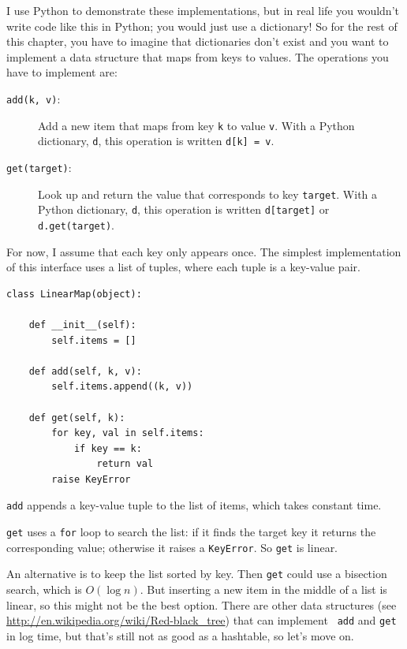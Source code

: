 \documentclass[10pt]{book}
\begin{document}
I use Python to demonstrate these implementations, but in real
life you wouldn't write code like this in Python; you would just use a
dictionary!  So for the rest of this chapter, you have to imagine that
dictionaries don't exist and you want to implement a data structure
that maps from keys to values.  The operations you have to
implement are:

\begin{description}

\item[{\tt add(k, v)}:] Add a new item that maps from key {\tt k}
to value {\tt v}.  With a Python dictionary, {\tt d}, this operation
is written {\tt d[k] = v}.

\item[{\tt get(target)}:] Look up and return the value that corresponds
to key {\tt target}.  With a Python dictionary, {\tt d}, this operation
is written {\tt d[target]} or {\tt d.get(target)}.

\end{description}

For now, I assume that each key only appears once.
The simplest implementation of this interface uses a list of
tuples, where each tuple is a key-value pair.

\begin{verbatim}
class LinearMap(object):

    def __init__(self):
        self.items = []

    def add(self, k, v):
        self.items.append((k, v))

    def get(self, k):
        for key, val in self.items:
            if key == k:
                return val
        raise KeyError
\end{verbatim}

{\tt add} appends a key-value tuple to the list of items, which
takes constant time.

{\tt get} uses a {\tt for} loop to search the list:
if it finds the target key it returns the corresponding value;
otherwise it raises a {\tt KeyError}.
So {\tt get} is linear.

An alternative is to keep the list sorted by key.  Then {\tt get}
could use a bisection search, which is $O(\log n)$.  But inserting a
new item in the middle of a list is linear, so this might not be the
best option.  There are other data structures (see
  \url{http://en.wikipedia.org/wiki/Red-black_tree})  that can implement {\tt
  add} and {\tt get} in log time, but that's still not as good as a
hashtable, so let's move on.
\end{document}
